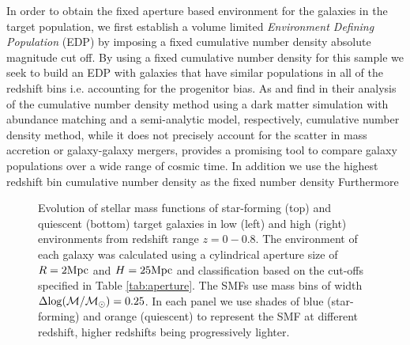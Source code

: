 \documentclass{emulateapj}
\begin{document}
In order to obtain the fixed aperture based environment for the galaxies in the target population, 
we first establish a volume limited {\it Environment Defining Population} (EDP) by imposing a fixed 
cumulative number density absolute magnitude cut off. 
By using a fixed cumulative number density for this sample we seek to build an EDP with galaxies that 
have similar populations in all of the redshift bins i.e. accounting for the progenitor bias. 
As \cite{Behroozi:2013aa} and \cite{Leja:2013aa} find in their analysis of the cumulative number density 
method using a dark matter simulation with abundance matching and a semi-analytic model, respectively, 
cumulative number density method, while it does not precisely account for the scatter in mass accretion or 
galaxy-galaxy mergers, provides a promising tool to compare galaxy populations over a wide range of cosmic time.
In addition we use the highest redshift bin cumulative number density as the fixed number density 
Furthermore \cite{Behroozi:2013aa}
\begin{figure*}
  \begin{center}
    \leavevmode
     \label{fig:smf}
     \caption{Evolution of stellar mass functions of star-forming (top) and quiescent (bottom) target galaxies in 
low (left) and high (right) environments from redshift range $z=0-0.8$. The environment of each galaxy  
was calculated using a cylindrical aperture size of $R=2\rm{Mpc}$ and $H=25\rm{Mpc}$ and  
classification based on the cut-offs specified in Table \ref{tab:aperture}. The SMFs use mass bins of 
width $\Delta \rm{log}(\mathcal{M}/\mathcal{M}_{\odot})=0.25$. In each panel we use shades of blue 
(star-forming) and orange (quiescent) to represent the SMF at different redshift, higher redshifts being
progressively lighter.}
    \end{center}
\end{figure*}
\end{document}
